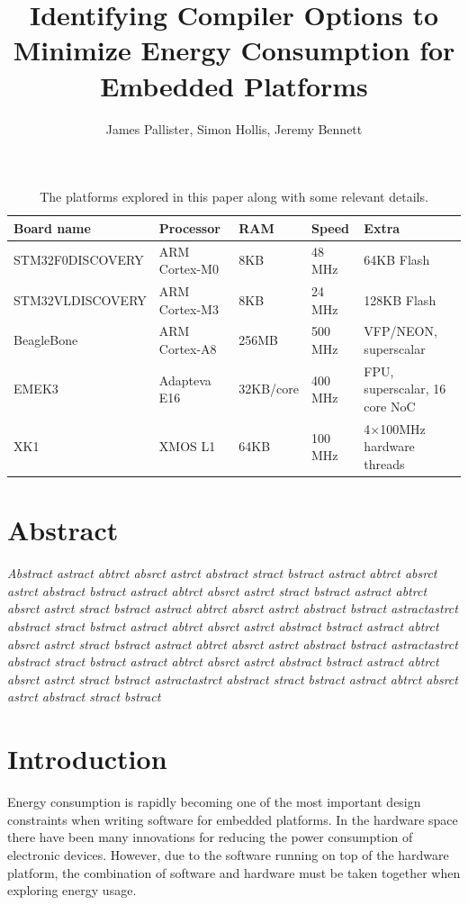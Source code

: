 \documentclass[twocolumn]{article}
\title{\bfseries Identifying Compiler Options to Minimize Energy Consumption for Embedded Platforms}
\author{James Pallister, Simon Hollis, Jeremy Bennett}
\begin{document}
\maketitle

\begin{table}[!hbt]
	\begin{tabular}{l l l l l}
		\textbf{Board name} & \textbf{Processor} & \textbf{RAM} & \textbf{Speed} & \textbf{Extra} \\
		\hline
		STM32F0DISCOVERY	& ARM Cortex-M0 		& 8KB		& 48 MHz		  & 64KB Flash\\
		STM32VLDISCOVERY	& ARM Cortex-M3 		& 8KB		& 24 MHz		  & 128KB Flash\\
		BeagleBone			& ARM Cortex-A8 		& 256MB		& 500 MHz		  & VFP/NEON, superscalar\\
		EMEK3				& Adapteva E16 			& 32KB/core & 400 MHz		  & FPU, superscalar, 16 core NoC\\
		XK1					& XMOS L1 				& 64KB		& 100 MHz 		& 4$\times$100MHz hardware threads \\
	\end{tabular}
	\caption{The platforms explored in this paper along with some relevant details.}
	\label{Table:Platforms}
\end{table}

\section*{Abstract}

\textit{
Abstract astract abtrct absrct astrct abstract stract bstract
astract abtrct absrct astrct abstract bstract
astract abtrct absrct astrct stract bstract
astract abtrct absrct astrct stract bstract
astract abtrct absrct astrct abstract bstract
astractastrct abstract stract bstract
astract abtrct absrct astrct abstract bstract
astract abtrct absrct astrct stract bstract
astract abtrct absrct astrct abstract bstract
astractastrct abstract stract bstract
astract abtrct absrct astrct abstract bstract
astract abtrct absrct astrct stract bstract
astractastrct abstract stract bstract
astract abtrct absrct astrct abstract stract bstract
}

\section*{Introduction}


Energy consumption is rapidly becoming one of the most important design constraints when writing software for embedded platforms. In the hardware space there have been many innovations for reducing the power consumption of electronic devices. However, due to the software running on top of the hardware platform, the combination of software and hardware must be taken together when exploring energy usage.
\end{document}
